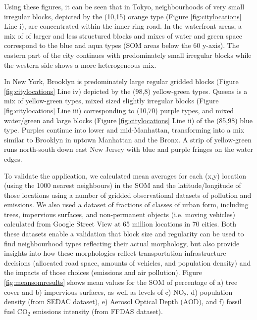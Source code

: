 \documentclass[9pt,twocolumn,twoside,lineno]{pnas-new}
\begin{document}
Using these figures, it can be seen that in Tokyo, neighbourhoods of very small irregular blocks, depicted by the (10,15) orange type (Figure \ref{fig:citylocations} Line i), are concentrated within the inner ring road. In the waterfront areas, a mix of of larger and less structured blocks and mixes of water and green space correspond to the blue and aqua types (SOM areas below the 60 y-axis). The eastern part of the city continues with predominately small irregular blocks while the western side shows a more heterogeneous mix. 

In New York, Brooklyn is predominately large regular gridded blocks (Figure \ref{fig:citylocations} Line iv) depicted by the (98,8) yellow-green types. Queens is a mix of yellow-green types, mixed sized slightly irregular blocks (Figure \ref{fig:citylocations} Line iii) corresponding to (10,70) purple types, and mixed water/green and large blocks (Figure \ref{fig:citylocations} Line ii) of the (85,98) blue type. Purples continue into lower and mid-Manhattan, transforming into a mix similar to Brooklyn in uptown Manhattan and the Bronx. A strip of yellow-green runs north-south down east New Jersey with blue and purple fringes on the water edges.

To validate the application, we calculated mean averages for each (x,y) location (using the 1000 nearest neighbours) in the SOM and the latitude/longitude of those locations using a number of gridded observational datasets of pollution and emissions. We also used a dataset of fractions of classes of urban form, including trees, impervious surfaces, and non-permanent objects (i.e. moving vehicles) calculated from Google Street View at 65 million locations in 70 cities\cite{Middel2019,Middel2018}. Both these datasets enable a validation that block size and regularity can be used to find neighbourhood types reflecting their actual morphology, but also provide insights into how these morphologies reflect transportation infrastructure decisions (allocated road space, amounts of vehicles, and population density) and the impacts of those choices (emissions and air pollution). Figure \ref{fig:meansomresults} shows mean values for the SOM of percentage of a) tree cover and b) impervious surfaces, as well as levels of c) NO$_{2}$, d) population density (from SEDAC dataset), e) Aerosol Optical Depth (AOD), and f) fossil fuel CO$_{2}$ emissions intensity (from FFDAS dataset).
\end{document}
